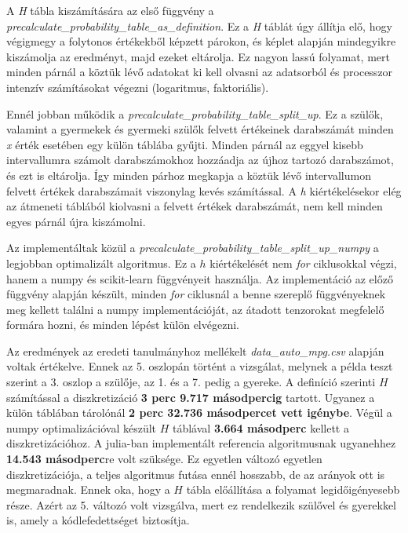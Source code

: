 A \emph{H} tábla kiszámítására az első függvény a \emph{precalculate\_probability\_table\_as\_definition}. Ez a \emph{H} táblát úgy állítja elő, hogy végigmegy a folytonos értékekből képzett párokon, és képlet alapján mindegyikre kiszámolja az eredményt, majd ezeket eltárolja. Ez nagyon lassú folyamat, mert minden párnál a köztük lévő adatokat ki kell olvasni az adatsorból és processzor intenzív számításokat végezni (logaritmus, faktoriális).

Ennél jobban működik a \emph{precalculate\_probability\_table\_split\_up}. Ez a szülők, valamint a gyermekek és gyermeki szülők felvett értékeinek darabszámát minden \emph{x} érték esetében egy külön táblába gyűjti. Minden párnál az eggyel kisebb intervallumra számolt darabszámokhoz hozzáadja az újhoz tartozó darabszámot, és ezt is eltárolja. Így minden párhoz megkapja a köztük lévő intervallumon felvett értékek darabszámait viszonylag kevés számítással. A \emph{h} kiértékelésekor elég az átmeneti táblából kiolvasni a felvett értékek darabszámát, nem kell minden egyes párnál újra kiszámolni.

Az implementáltak közül a \emph{precalculate\_probability\_table\_split\_up\_numpy} a legjobban optimalizált algoritmus. Ez a $h$ kiértékelését nem \emph{for} ciklusokkal végzi, hanem a numpy és scikit-learn függvényeit használja. Az implementáció az előző függvény alapján készült, minden \emph{for} ciklusnál a benne szereplő függvényeknek meg kellett találni a numpy implementációját, az átadott tenzorokat megfelelő formára hozni, és minden lépést külön elvégezni.

Az eredmények az eredeti tanulmányhoz mellékelt \emph{data\_auto\_mpg.csv} alapján voltak értékelve. Ennek az 5. oszlopán történt a vizsgálat, melynek a példa teszt szerint a 3. oszlop a szülője, az 1. és a 7. pedig a gyereke. A definíció szerinti $H$ számítással a diszkretizáció \textbf{3 perc 9.717 másodpercig}  tartott. Ugyanez a külön táblában tárolónál \textbf{2 perc 32.736 másodpercet vett igénybe}. Végül a numpy optimalizációval készült $H$ táblával \textbf{3.664 másodperc} kellett a diszkretizációhoz. A julia-ban implementált referencia algoritmusnak ugyanehhez \textbf{14.543 másodperc}re volt szüksége. Ez egyetlen változó egyetlen diszkretizációja, a teljes algoritmus futása ennél hosszabb, de az arányok ott is megmaradnak. Ennek oka, hogy a $H$ tábla előállítása a folyamat legidőigényesebb része. Azért az 5. változó volt vizsgálva, mert ez rendelkezik szülővel és gyerekkel is, amely a kódlefedettséget biztosítja.

